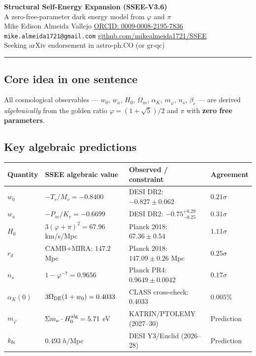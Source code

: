 \documentclass[11pt,a4paper]{article}
\begin{document}
\begin{center}
  {\Large\bfseries Structural Self-Energy Expansion (SSEE-V3.6)}\\[4pt]
  {\large A zero-free-parameter dark energy model from $\varphi$ and $\pi$}\\[6pt]
  Mike Edison Almeida Vallejo \quad
  \href{https://orcid.org/0009-0008-2195-7836}{ORCID: 0009-0008-2195-7836}\\
  \texttt{mike.almeida1721@gmail.com} \quad
  \href{https://github.com/mikealmeida1721/SSEE}{github.com/mikealmeida1721/SSEE}\\[2pt]
  {\small\color{gray}Seeking arXiv endorsement in astro-ph.CO (or gr-qc)}
\end{center}

\hrule\vspace{6pt}

\subsection*{Core idea in one sentence}

All cosmological observables — $w_0$, $w_a$, $H_0$, $\Omega_m$, $\alpha_K$,
$m_\varphi$, $n_s$, $\beta_c$ — are derived \emph{algebraically} from the
golden ratio $\varphi=(1+\sqrt{5})/2$ and $\pi$ with \textbf{zero free parameters}.

\subsection*{Key algebraic predictions}

\begin{center}
\begin{tabular}{llll}
\toprule
\textbf{Quantity} & \textbf{SSEE algebraic value} & \textbf{Observed / constraint} & \textbf{Agreement} \\
\midrule
$w_0$ & $-T_r/M_v = -0.8400$ & DESI DR2: $-0.827\pm0.062$ & $0.21\sigma$ \\
$w_a$ & $-P_{sc}/K_v = -0.6699$ & DESI DR2: $-0.75^{+0.29}_{-0.25}$ & $0.31\sigma$ \\
$H_0$ & $3(\varphi+\pi)^2 = 67.96$ km/s/Mpc & Planck 2018: $67.36\pm0.54$ & $1.11\sigma$ \\
$r_d$ & CAMB+MIRA: $147.2$ Mpc & Planck 2018: $147.09\pm0.26$ Mpc & $0.25\sigma$ \\
$n_s$ & $1-\varphi^{-7} = 0.9656$ & Planck PR4: $0.9649\pm0.0042$ & $0.17\sigma$ \\
$\alpha_K(0)$ & $3\Omega_{\rm DE}(1+w_0) = 0.4033$ & CLASS cross-check: $0.4033$ & $0.005\%$ \\
$m_\varphi$ & $\Sigma m_\nu\cdot H_0^{\rm alg} = 5.71$ eV & KATRIN/PTOLEMY (2027--30) & Prediction \\
$k_{\rm fs}$ & $0.493\;h$/Mpc & DESI Y3/Euclid (2026--28) & Prediction \\
\bottomrule
\end{tabular}
\end{center}
\end{document}
